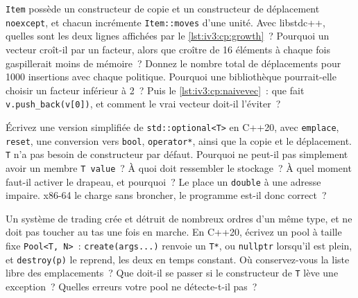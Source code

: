 \begin{question}\label{iq:iv3:cpp:41}
\texttt{Item} possède un constructeur de copie et un constructeur de déplacement \texttt{noexcept}, et chacun incrémente \texttt{Item::moves} d'une unité. Avec libstdc++, quelles sont les deux lignes affichées par le \cref{lst:iv3:cp:growth}~? Pourquoi un vecteur croît-il par un facteur, alors que croître de 16 éléments à chaque fois gaspillerait moins de mémoire~? Donnez le nombre total de déplacements pour 1000 insertions avec chaque politique. Pourquoi une bibliothèque pourrait-elle choisir un facteur inférieur à 2~? Puis le \cref{lst:iv3:cp:naivevec}~: que fait \texttt{v.push\_back(v[0])}, et comment le vrai vecteur doit-il l'éviter~?
\label{lst:iv3:cp:growth}
\label{lst:iv3:cp:naivevec}
\end{question}

\begin{question}\label{iq:iv3:cpp:42}
Écrivez une version simplifiée de \texttt{std::optional<T>} en C++20, avec \texttt{emplace}, \texttt{reset}, une conversion vers \texttt{bool}, \texttt{operator*}, ainsi que la copie et le déplacement. \texttt{T} n'a pas besoin de constructeur par défaut. Pourquoi ne peut-il pas simplement avoir un membre \texttt{T value}~? À quoi doit ressembler le stockage~? À quel moment faut-il activer le drapeau, et pourquoi~? Le  place un \texttt{double} à une adresse impaire. x86-64 le charge sans broncher, le programme est-il donc correct~?
\label{lst:iv3:cp:misaligned}
\end{question}

\begin{question}\label{iq:iv3:cpp:43}
Un système de trading crée et détruit de nombreux ordres d'un même type, et ne doit pas toucher au tas une fois en marche. En C++20, écrivez un pool à taille fixe \texttt{Pool<T, N>}~: \texttt{create(args.{}.{}.)} renvoie un \texttt{T*}, ou \texttt{nullptr} lorsqu'il est plein, et \texttt{destroy(p)} le reprend, les deux en temps constant. Où conservez-vous la liste libre des emplacements~? Que doit-il se passer si le constructeur de \texttt{T} lève une exception~? Quelles erreurs votre pool ne détecte-t-il pas~?
\end{question}

